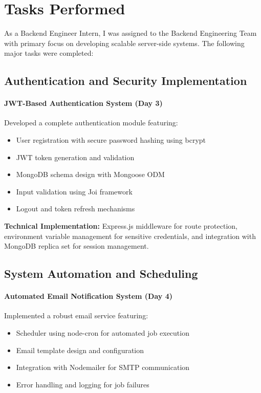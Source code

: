 
\section{Tasks Performed}

As a Backend Engineer Intern, I was assigned to the Backend Engineering Team with primary focus on developing scalable server-side systems. The following major tasks were completed:

\subsection{Authentication and Security Implementation}

\paragraph{JWT-Based Authentication System (Day 3)}

Developed a complete authentication module featuring:
\begin{itemize}
    \item User registration with secure password hashing using bcrypt
    \item JWT token generation and validation
    \item MongoDB schema design with Mongoose ODM
    \item Input validation using Joi framework
    \item Logout and token refresh mechanisms
\end{itemize}

\textbf{Technical Implementation:} Express.js middleware for route protection, environment variable management for sensitive credentials, and integration with MongoDB replica set for session management.

\subsection{System Automation and Scheduling}

\paragraph{Automated Email Notification System (Day 4)}

Implemented a robust email service featuring:
\begin{itemize}
    \item Scheduler using node-cron for automated job execution
    \item Email template design and configuration
    \item Integration with Nodemailer for SMTP communication
    \item Error handling and logging for job failures
\end{itemize}

